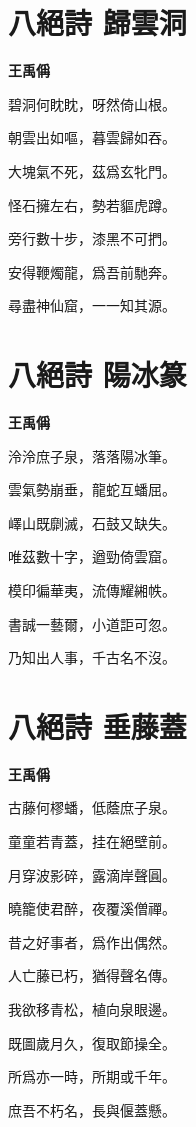 \documentclass[12pt,a4paper]{ctexbook}
\begin{document}
\section{八絕詩 歸雲洞}
\textbf{王禹偁}\par\vspace{0.5em}
碧洞何眈眈，呀然倚山根。\par
朝雲出如嘔，暮雲歸如吞。\par
大塊氣不死，茲爲玄牝門。\par
怪石擁左右，勢若貙虎蹲。\par
旁行數十步，漆黑不可捫。\par
安得鞭燭龍，爲吾前馳奔。\par
尋盡神仙窟，一一知其源。\par

\section{八絕詩 陽冰篆}
\textbf{王禹偁}\par\vspace{0.5em}
泠泠庶子泉，落落陽冰筆。\par
雲氣勢崩垂，龍蛇互蟠屈。\par
嶧山既劘滅，石鼓又缺失。\par
唯茲數十字，遒勁倚雲窟。\par
模印徧華夷，流傳耀緗帙。\par
書誠一藝爾，小道詎可忽。\par
乃知出人事，千古名不沒。\par

\section{八絕詩 垂藤蓋}
\textbf{王禹偁}\par\vspace{0.5em}
古藤何樛蟠，低蔭庶子泉。\par
童童若青蓋，挂在絕壁前。\par
月穿波影碎，露滴岸聲圓。\par
曉籠使君醉，夜覆溪僧禪。\par
昔之好事者，爲作出偶然。\par
人亡藤已朽，猶得聲名傳。\par
我欲移青松，植向泉眼邊。\par
既圖歲月久，復取節操全。\par
所爲亦一時，所期或千年。\par
庶吾不朽名，長與偃蓋懸。\par
\end{document}
